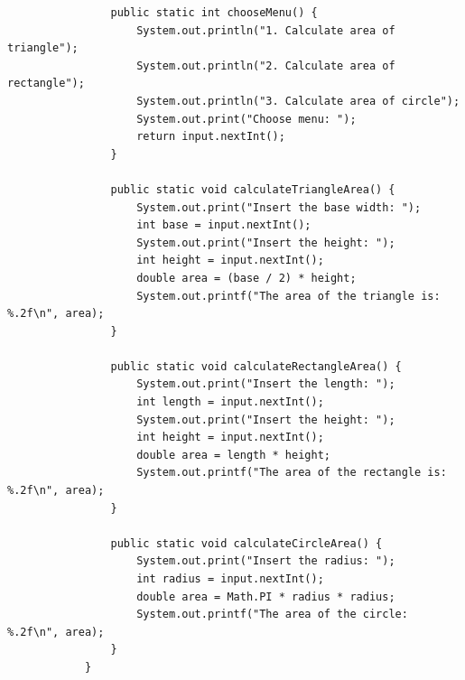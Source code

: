\documentclass[12pt,titlepage]{article}
\begin{document}
\begin{enumerate}
{\begin{verbatim}
                public static int chooseMenu() {
                    System.out.println("1. Calculate area of triangle");
                    System.out.println("2. Calculate area of rectangle");
                    System.out.println("3. Calculate area of circle");
                    System.out.print("Choose menu: ");
                    return input.nextInt();
                }

                public static void calculateTriangleArea() {
                    System.out.print("Insert the base width: ");
                    int base = input.nextInt();
                    System.out.print("Insert the height: ");
                    int height = input.nextInt();
                    double area = (base / 2) * height;
                    System.out.printf("The area of the triangle is: %.2f\n", area);
                }

                public static void calculateRectangleArea() {
                    System.out.print("Insert the length: ");
                    int length = input.nextInt();
                    System.out.print("Insert the height: ");
                    int height = input.nextInt();
                    double area = length * height;
                    System.out.printf("The area of the rectangle is: %.2f\n", area);
                }

                public static void calculateCircleArea() {
                    System.out.print("Insert the radius: ");
                    int radius = input.nextInt();
                    double area = Math.PI * radius * radius;
                    System.out.printf("The area of the circle: %.2f\n", area);
                }
            }

        \end{verbatim}
    }
\end{enumerate}
\end{document}
